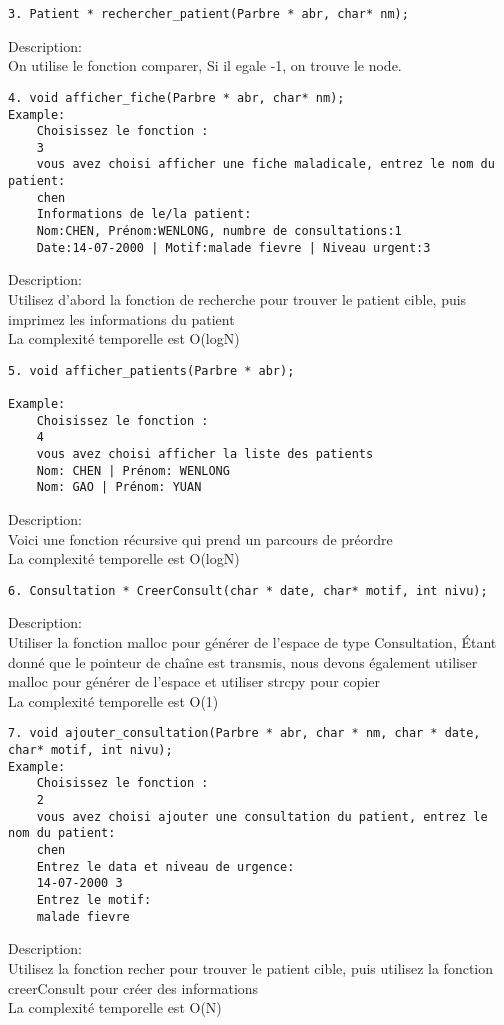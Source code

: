 \documentclass[11pt]{article}
\begin{document}
\begin{verbatim}
3. Patient * rechercher_patient(Parbre * abr, char* nm);
\end{verbatim}
Description:\\
On utilise le fonction comparer, Si il egale -1, on trouve le node.

\begin{verbatim}
4. void afficher_fiche(Parbre * abr, char* nm);
Example:
    Choisissez le fonction :
    3
    vous avez choisi afficher une fiche maladicale, entrez le nom du patient:
    chen
    Informations de le/la patient:
    Nom:CHEN, Prénom:WENLONG, numbre de consultations:1
    Date:14-07-2000 | Motif:malade fievre | Niveau urgent:3
\end{verbatim}
Description:\\
Utilisez d'abord la fonction de recherche pour trouver le patient cible, puis imprimez les informations du patient\\
La complexité temporelle est O(logN)


\begin{verbatim}
5. void afficher_patients(Parbre * abr);

Example:
    Choisissez le fonction :
    4
    vous avez choisi afficher la liste des patients
    Nom: CHEN | Prénom: WENLONG
    Nom: GAO | Prénom: YUAN
\end{verbatim}
Description:\\
Voici une fonction récursive qui prend un parcours de préordre\\
La complexité temporelle est O(logN)

\begin{verbatim}
6. Consultation * CreerConsult(char * date, char* motif, int nivu);
\end{verbatim}
Description:\\
Utiliser la fonction malloc pour générer de l'espace de type Consultation, Étant donné que le pointeur de chaîne est transmis, nous devons également utiliser malloc pour générer de l'espace et utiliser strcpy pour copier\\
La complexité temporelle est O(1)

\begin{verbatim}
7. void ajouter_consultation(Parbre * abr, char * nm, char * date, char* motif, int nivu);
Example:
    Choisissez le fonction :
    2
    vous avez choisi ajouter une consultation du patient, entrez le nom du patient:
    chen
    Entrez le data et niveau de urgence:
    14-07-2000 3
    Entrez le motif:
    malade fievre
\end{verbatim}
Description:\\
Utilisez la fonction recher pour trouver le patient cible, puis utilisez la fonction creerConsult pour créer des informations\\
La complexité temporelle est O(N)
\end{document}

